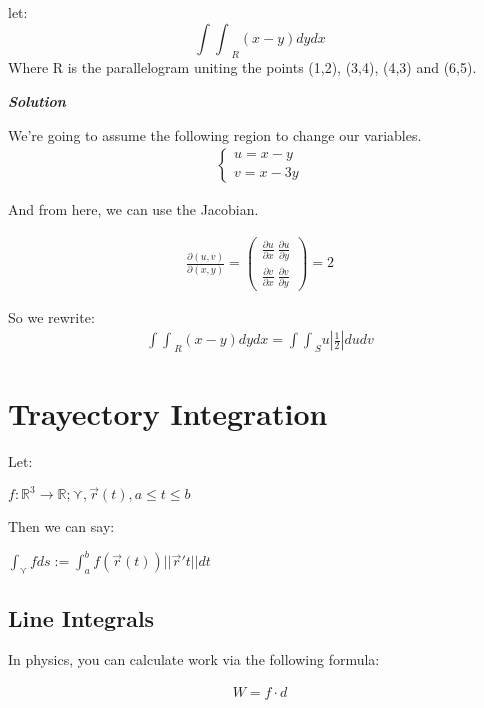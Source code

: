 \documentclass[11pt,fleqn]{book} %
\begin{document}
\begin{example}
    let:
    $${\int\int}_{R} (x-y) dydx$$
    Where R is the parallelogram uniting the points (1,2), (3,4), (4,3) and (6,5).

    \textbf{\textit{Solution}}

    We're going to assume the following region to change our variables.
    \begin{gather}
        \begin{cases}
            u = x-y \\ v = x-3y
        \end{cases}
    \end{gather}

    And from here, we can use the Jacobian.

    \begin{gather}
        \frac{\partial(u,v)}{\partial(x,y)} = \begin{pmatrix}
            \frac{\partial u}{\partial x} \ \frac{\partial u}{\partial y}\\
            \frac{\partial v}{\partial x} \ \frac{\partial v}{\partial y}
        \end{pmatrix} = 2
    \end{gather}

    So we rewrite:
    \begin{gather}
        {\int\int}_R (x-y) dydx = {\int\int}_S u | \frac{1}{2} | dudv
    \end{gather}
\end{example}


\chapter{Trayectory Integration}

Let: 

$f: \mathbb{R}^3 \to \mathbb{R}; \curlyvee, \vec{r}(t), a \leq t \leq b$

Then we can say:

$\int_\curlyvee f ds := \int_a^b f(\vec{r}(t)) ||\vec{r}'t|| dt$

\section{Line Integrals}

In physics, you can calculate work via the following formula:

\begin{gather}
    W = f \cdot d
\end{gather}
\end{document}
